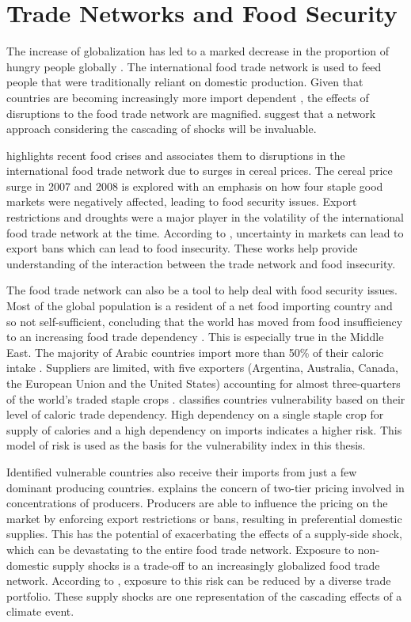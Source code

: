 \section{Trade Networks and Food Security}
The increase of globalization has led to a marked decrease in the proportion of hungry people globally \citep{godfray2010food}. The international food trade network is used to feed people that were traditionally reliant on domestic production. Given that countries are becoming increasingly more import dependent \citep{d2014feeding}, the effects of disruptions to the food trade network are magnified. \cite{kali2007architecture} suggest that a network approach considering the cascading of shocks will be invaluable.\par
\cite{headey2011rethinking} highlights recent food crises and associates them to disruptions in the international food trade network due to surges in cereal prices. The cereal price surge in 2007 and 2008 is explored with an emphasis on how four staple good markets were negatively affected, leading to food security issues. Export restrictions and droughts were a major player in the volatility of the international food trade network at the time. According to \citep{brobakk2011increasing}, uncertainty in markets can lead to export bans which can lead to food insecurity. These works help provide understanding of the interaction between the trade network and food insecurity.\par
The food trade network can also be a tool to help deal with food security issues. Most of the global population is a resident of a net food importing country and so not self-sufficient, concluding that the world has moved from food insufficiency to an increasing food trade dependency \citep{porkka2013food}. This is especially true in the Middle East. The majority of Arabic countries import more than 50\% of their caloric intake \citep{faostat}. Suppliers are limited, with five exporters (Argentina, Australia, Canada, the European Union and the United States) accounting for almost three-quarters of the world's traded staple crops \citep{faostat}. \cite{d2016teleconnected} classifies countries vulnerability based on their level of caloric trade dependency. High dependency on a single staple crop for supply of calories and a high dependency on imports indicates a higher risk. This model of risk is used as the basis for the vulnerability index in this thesis.\par
Identified vulnerable countries also receive their imports from just a few dominant producing countries. \cite{silberglitt2015critical} explains the concern of two-tier pricing involved in concentrations of producers. Producers are able to influence the pricing on the market by enforcing export restrictions or bans, resulting in preferential domestic supplies. This has the potential of exacerbating the effects of a supply-side shock, which can be devastating to the entire food trade network. Exposure to non-domestic supply shocks is a trade-off to an increasingly globalized food trade network. According to \cite{gephart2016vulnerability}, exposure to this risk can be reduced by a diverse trade portfolio. These supply shocks are one representation of the cascading effects of a climate event.\par
